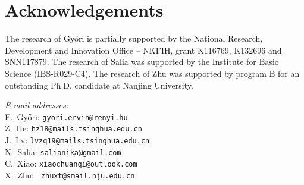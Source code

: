 \documentclass[a4paper,11pt]{article}
\begin{document}
\section{Acknowledgements}
 The research of Gy\H{o}ri is partially supported by the National Research, Development and Innovation Office -- NKFIH, grant K116769, K132696 and SNN117879.  
 The research of Salia was supported by the Institute for Basic Science (IBS-R029-C4).
The research of Zhu was supported by program B for an outstanding Ph.D. candidate at Nanjing University.



  \textit{E-mail addresses:} \\
  E.~Gy\H{o}ri: \texttt{gyori.ervin@renyi.hu}\\
  Z.~He: \texttt{hz18@mails.tsinghua.edu.cn}\\
  J.~Lv: \texttt{lvzq19@mails.tsinghua.edu.cn}\\
  N.~Salia: \texttt{salianika@gmail.com}\\
  C.~Xiao: \texttt{xiaochuanqi@outlook.com}\\
  X.~Zhu: \texttt{ zhuxt@smail.nju.edu.cn}
\end{document}
